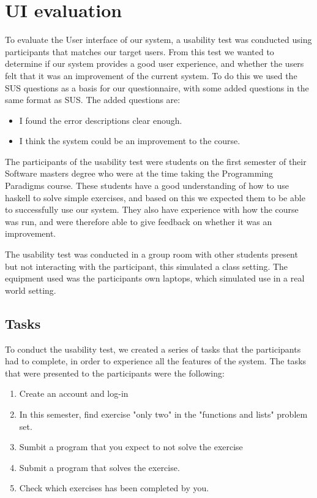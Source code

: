 \section{UI evaluation} \label{UIEval}
To evaluate the User interface of our system, a usability test was conducted using participants that matches our target users. From this test we wanted to determine if our system provides a good user experience, and whether the users felt that it was an improvement of the current system.
To do this we used the SUS questions as a basis for our questionnaire, with some added questions in the same format as SUS. The added questions are:
\begin{itemize}
    \item I found the error descriptions clear enough.
    \item I think the system could be an improvement to the course.
\end{itemize}
The participants of the usability test were students on the first semester of their Software masters degree who were at the time taking the Programming Paradigms course. 
These students have a good understanding of how to use haskell to solve simple exercises, and based on this we expected them to be able to successfully use our system. They also have experience with how the course was run, and were therefore able to give feedback on whether it was an improvement.

The usability test was conducted in a group room with other students present but not interacting with the participant, this simulated a class setting. 
The equipment used was the participants own laptops, which simulated use in a real world setting.

\subsection*{Tasks}
To conduct the usability test, we created a series of tasks that the participants had to complete, in order to experience all the features of the system.
The tasks that were presented to the participants were the following:
\begin{enumerate}
    \item Create an account and log-in
    \item In this semester, find exercise "only two" in the "functions and lists" problem set.
    \item Sumbit a program that you expect to not solve the exercise
    \item Submit a program that solves the exercise.
    \item Check which exercises has been completed by you.
\end{enumerate}


